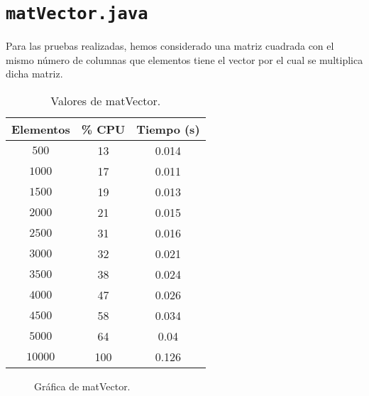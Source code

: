\documentclass[12pt,letterpaper]{article}
\begin{document}
\section{\texttt{matVector.java}}
\noindent
Para las pruebas realizadas, hemos considerado una matriz cuadrada con el mismo número de columnas que elementos tiene el vector por el cual se multiplica dicha matriz.
\begin{center}
	\begin{table}[htbp]
		\begin{center}
			\begin{tabular}{|c|c|c|}
				\hline
				\textbf{Elementos} & \textbf{\% CPU} & \textbf{Tiempo (s)}  \\
				\hline 
				$500$ & 13 & 0.014\\ \hline	
				$1000$ & 17 & 0.011\\ \hline
				$1500$ & 19 & 0.013\\ \hline
				$2000$ & 21 & 0.015\\ \hline
				$2500$ & 31 & 0.016\\ \hline
				$3000$ & 32 & 0.021\\ \hline
				$3500$ & 38 & 0.024\\ \hline
				$4000$ & 47 & 0.026\\ \hline
				$4500$ & 58 & 0.034\\ \hline
				$5000$ & 64 & 0.04\\ \hline				
				$10000$ & 100 & 0.126\\ \hline	
			\end{tabular}
			\caption{Valores de matVector.}
			\label{tabla:Valores de matVector}
		\end{center}
	\end{table}
\end{center}
\newpage
\begin{figure}
	\begin{center}
		\caption{Gráfica de matVector.}
		\label{fig: matVector}
	\end{center}
\end{figure}

\newpage
\end{document}
